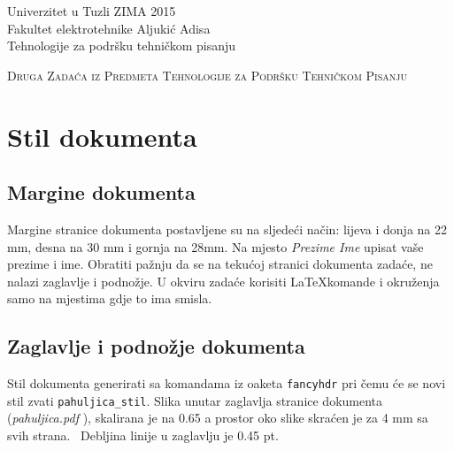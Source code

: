 \documentclass[letter paper]{article}
\newcommand{\newsize}[1]{\color{black}\fontsize{8pt}{10pt}\selectfont{#1}}
\newcommand{\newtodo}[1]{\todo{\newsize{#1}}}
\begin{document}
\noindent Univerzitet u Tuzli \hfill ZIMA 2015 \\
Fakultet elektrotehnike \hfill Aljukić Adisa \\
Tehnologije za podršku tehničkom pisanju 

\vspace{5mm}
\begin{center}
 \LARGE {\textsc{Druga Zadaća iz Predmeta Tehnologije za Podršku Tehničkom Pisanju}\newtodo{Naslov dokumenta vertikalno je pomjeren za 5mm u odnosu na prethodni i naredni sadržaj.}}\\ 
\end{center}

\vspace{5mm}

\begin{abstract}
U okviru zadaće II biti će demonstrirano svo stečeno znanje iz predmeta Tehnologije za podršku tehničkom pisanju vezano za \LaTeX.~ Studenti će demonstrirati stečeno znanje na način da repliciraju sadržaj dokumenta(stranice od 1 do 4) pri čemu moraju obratiti pažnju na svaki detalj u orginalnom dokumentu. Replicirani dokument mora biti vjerodostojna kopija orginalnom dokumentu(100\% kopija osim dijela prezime i ime.  Kako rezultat, studenti će predati kod prema pravilima definiranim na prethodnoj stranici teksta zadaće.
\end{abstract}

\tableofcontents
\listoffigures
\listoftables

\section{Stil dokumenta}

\subsection{Margine dokumenta}
Margine stranice dokumenta postavljene su na sljedeći način: lijeva i donja na 22 mm, desna na 30 mm i gornja na 28mm. Na mjesto \textsl{Prezime Ime} upisat vaše prezime i ime. Obratiti pažnju da se na tekućoj stranici dokumenta zadaće, ne nalazi zaglavlje i podnožje. U okviru zadaće korisiti \LaTeX komande i okruženja samo na mjestima gdje to ima smisla.

\newpage

\pagestyle{pahuljica_stil}

\subsection{Zaglavlje i podnožje dokumenta}
Stil dokumenta generirati sa komandama iz oaketa \texttt{fancyhdr} pri čemu će se novi stil zvati \texttt{pahuljica\_stil}. Slika unutar zaglavlja stranice dokumenta (\textsl{pahuljica.pdf} ),  skalirana je na 0.65 a prostor oko slike skraćen je za 4 mm sa svih strana.\newtodo{Upotrijebiti \texttt{trim} \& \texttt{clip} opcije}~ Debljina linije u zaglavlju je 0.45 pt.
\end{document}
